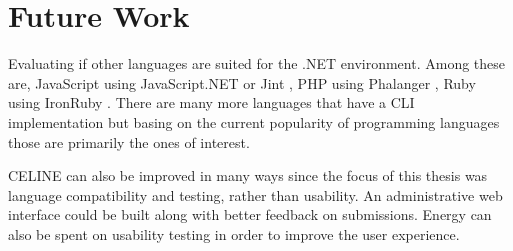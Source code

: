 \section{Future Work}

Evaluating if other languages are suited for the .NET environment. Among these are, JavaScript using JavaScript.NET \cite{JavaScript.NET} or Jint \cite{Jint}, PHP using Phalanger \cite{Phalanger}, Ruby using IronRuby \cite{IronRuby}. There are many more languages that have a CLI implementation but basing on the current popularity of programming languages \cite{Tiobe} those are primarily the ones of interest.

CELINE can also be improved in many ways since the focus of this thesis was language compatibility and testing, rather than usability. An administrative web interface could be built along with better feedback on submissions. Energy can also be spent on usability testing in order to improve the user experience.
